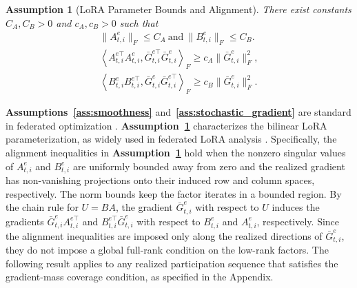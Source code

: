 \documentclass[lettersize,journal]{IEEEtran}
\newtheorem{assumption}{Assumption}
\begin{document}
\begin{assumption}[LoRA Parameter Bounds and Alignment]
	\label{ass:factor_condition}
	There exist constants $C_A,C_B>0$ and $c_A,c_B > 0$ such that
	\begin{align}
		\|A_{t,i}^{e}\|_F\le C_A
		\ \mathrm{and} \
		\|B_{t,i}^{e}\|_F\le C_B.  \label{eq:factor_norm_bound} \\
		\left\langle
		A_{t,i}^{e\top}A_{t,i}^{e},
		\bar{G}_{t,i}^{e\top}\bar{G}_{t,i}^{e}
		\right\rangle_F
		\ge
		c_A
		\|\bar{G}_{t,i}^{e}\|_F^2,
		\nonumber \\
		\left\langle
		B_{t,i}^{e}B_{t,i}^{e\top},  \bar{G}_{t,i}^{e}\bar{G}_{t,i}^{e\top}
		\right\rangle_F
		\ge
		c_B
		\|\bar{G}_{t,i}^{e}\|_F^2. \label{eq:nondegenerate}
	\end{align}
\end{assumption}
\textbf{Assumptions~\ref{ass:smoothness}} and~\textbf{\ref{ass:stochastic_gradient}} are standard in federated optimization \cite{li2020convergence,yu2019parallel,reddi2021adaptive}. 
\textbf{Assumption~\ref{ass:factor_condition}} characterizes the bilinear LoRA parameterization, as
widely used in federated LoRA analysis \cite{guo2025selective,chen2025rolora,park2025communication}. {\color{black}Specifically, the alignment inequalities in \textbf{Assumption~\ref{ass:factor_condition}} hold when the nonzero singular values of $A_{t,i}^{e}$ and $B_{t,i}^{e}$ are uniformly bounded away from zero and the realized gradient has non-vanishing projections onto their induced row and column spaces, respectively.}
The norm bounds keep the factor iterates in a bounded region. By the chain rule for $U=BA$, the gradient $\bar{G}_{t,i}^{e}$ with respect to $U$ induces the gradients $\bar{G}_{t,i}^{e}A_{t,i}^{e\top}$ and $B_{t,i}^{e\top}\bar{G}_{t,i}^{e}$ with respect to $B_{t,i}^{e}$ and $A_{t,i}^{e}$, respectively. 
Since the alignment inequalities are imposed only along the realized directions of $\bar{G}_{t,i}^{e}$, they do not impose a global full-rank condition on the low-rank factors.
The following result applies to any realized participation sequence that satisfies the gradient-mass coverage condition, as specified in the Appendix.
\end{document}
